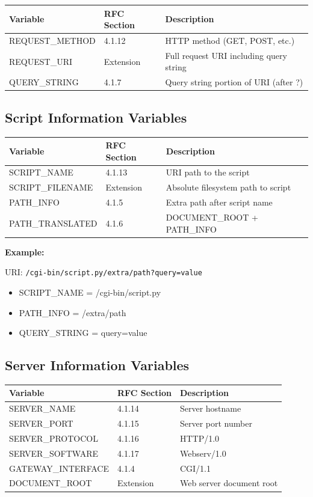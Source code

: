 \documentclass[11pt,a4paper]{article}
\begin{document}
\begin{tabular}{|l|l|p{6cm}|}
\hline
\textbf{Variable} & \textbf{RFC Section} & \textbf{Description} \\
\hline
REQUEST\_METHOD & 4.1.12 & HTTP method (GET, POST, etc.) \\
\hline
REQUEST\_URI & Extension & Full request URI including query string \\
\hline
QUERY\_STRING & 4.1.7 & Query string portion of URI (after ?) \\
\hline
\end{tabular}

\subsection{Script Information Variables}

\begin{tabular}{|l|l|p{6cm}|}
\hline
\textbf{Variable} & \textbf{RFC Section} & \textbf{Description} \\
\hline
SCRIPT\_NAME & 4.1.13 & URI path to the script \\
\hline
SCRIPT\_FILENAME & Extension & Absolute filesystem path to script \\
\hline
PATH\_INFO & 4.1.5 & Extra path after script name \\
\hline
PATH\_TRANSLATED & 4.1.6 & DOCUMENT\_ROOT + PATH\_INFO \\
\hline
\end{tabular}

\textbf{Example:}

URI: \texttt{/cgi-bin/script.py/extra/path?query=value}

\begin{itemize}
    \item SCRIPT\_NAME = /cgi-bin/script.py
    \item PATH\_INFO = /extra/path
    \item QUERY\_STRING = query=value
\end{itemize}

\subsection{Server Information Variables}

\begin{tabular}{|l|l|p{6cm}|}
\hline
\textbf{Variable} & \textbf{RFC Section} & \textbf{Description} \\
\hline
SERVER\_NAME & 4.1.14 & Server hostname \\
\hline
SERVER\_PORT & 4.1.15 & Server port number \\
\hline
SERVER\_PROTOCOL & 4.1.16 & HTTP/1.0 \\
\hline
SERVER\_SOFTWARE & 4.1.17 & Webserv/1.0 \\
\hline
GATEWAY\_INTERFACE & 4.1.4 & CGI/1.1 \\
\hline
DOCUMENT\_ROOT & Extension & Web server document root \\
\hline
\end{tabular}
\end{document}
